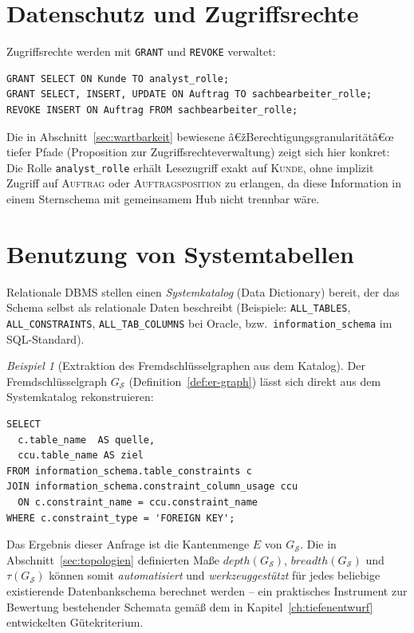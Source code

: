 ﻿\documentclass[a4paper,12pt]{report}
\theoremstyle{definition}
\theoremstyle{remark}
\newtheorem{example}{Beispiel}[chapter]
\newcommand{\depth}{\mathit{depth}}
\newcommand{\breadth}{\mathit{breadth}}
\begin{document}
\section{Datenschutz und Zugriffsrechte}
\label{sec:zugriffsrechte}

Zugriffsrechte werden mit \texttt{GRANT} und \texttt{REVOKE} verwaltet:

\begin{lstlisting}
GRANT SELECT ON Kunde TO analyst_rolle;
GRANT SELECT, INSERT, UPDATE ON Auftrag TO sachbearbeiter_rolle;
REVOKE INSERT ON Auftrag FROM sachbearbeiter_rolle;
\end{lstlisting}

Die in Abschnitt~\ref{sec:wartbarkeit} bewiesene
â€žBerechtigungsgranularitätâ€œ tiefer Pfade (Proposition zur
Zugriffsrechteverwaltung) zeigt sich hier konkret: Die Rolle
\texttt{analyst\_rolle} erhält Lesezugriff exakt auf
\textsc{Kunde}, ohne implizit Zugriff auf \textsc{Auftrag} oder
\textsc{Auftragsposition} zu erlangen, da diese Information in einem
Sternschema mit gemeinsamem Hub nicht trennbar wäre.

\section{Benutzung von Systemtabellen}
\label{sec:systemtabellen}

Relationale DBMS stellen einen \emph{Systemkatalog} (Data Dictionary)
bereit, der das Schema selbst als relationale Daten beschreibt
(Beispiele: \texttt{ALL\_TABLES}, \texttt{ALL\_CONSTRAINTS},
\texttt{ALL\_TAB\_COLUMNS} bei Oracle, bzw.\
\texttt{information\_schema} im SQL-Standard).

\begin{example}[Extraktion des Fremdschlüsselgraphen aus dem Katalog]
\label{ex:katalog-graph}
Der Fremdschlüsselgraph $G_{\mathcal{S}}$ (Definition~\ref{def:er-graph})
lässt sich direkt aus dem Systemkatalog rekonstruieren:
\begin{lstlisting}
SELECT
  c.table_name  AS quelle,
  ccu.table_name AS ziel
FROM information_schema.table_constraints c
JOIN information_schema.constraint_column_usage ccu
  ON c.constraint_name = ccu.constraint_name
WHERE c.constraint_type = 'FOREIGN KEY';
\end{lstlisting}
Das Ergebnis dieser Anfrage ist die Kantenmenge $E$ von
$G_{\mathcal{S}}$. Die in Abschnitt~\ref{sec:topologien}
definierten Maße $\depth(G_{\mathcal{S}})$, $\breadth(G_{\mathcal{S}})$
und $\tau(G_{\mathcal{S}})$ können somit \emph{automatisiert} und
\emph{werkzeuggestützt} für jedes beliebige existierende
Datenbankschema berechnet werden -- ein praktisches Instrument zur
Bewertung bestehender Schemata gemäß dem in
Kapitel~\ref{ch:tiefenentwurf} entwickelten Gütekriterium.
\end{example}
\end{document}

